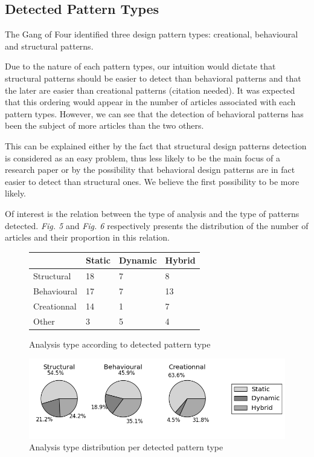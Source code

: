 \documentclass[letterpaper, 10 pt, conference]{ieeeconf}  %
\begin{document}
\subsection{Detected Pattern Types}

The Gang of Four identified three design pattern types: creational,
behavioural and structural patterns.

Due to the nature of each pattern types, our intuition would dictate that
structural patterns should be easier to detect than behavioral patterns and
that the later are easier than creational patterns (citation needed). 
It was expected that this ordering would appear in the number of articles
associated with each pattern types. 
However, we can see that the detection of behavioral patterns has been the
subject of more articles than the two others.


This can be explained either by the fact that structural design patterns
detection is considered as an easy problem, thus less likely to be the main
focus of a research paper or by the possibility that behavioral design
patterns are in fact easier to detect than structural ones.
We believe the first possibility to be more likely.

Of interest is the relation between the type of analysis and the type of
patterns detected. \textit{Fig. 5} and \textit{Fig. 6}
respectively presents the distribution of the number of articles and their
proportion in this relation. 


\begin{figure}
 \centering
 \begin{tabular}{llll}
             & Static & Dynamic & Hybrid \\
 \hline
 Structural  & 18 & 7 & 8 \\
 Behavioural & 17 & 7 & 13 \\
 Creationnal & 14 & 1 & 7 \\
 Other       & 3 & 5 & 4 \\
 \end{tabular}
 \caption{Analysis type according to detected pattern type}
\end{figure}

\begin{figure}[tb]
 \centering
 \includegraphics[scale=0.7]{analysis_v_pattern.png}
 \caption{Analysis type distribution per detected pattern type}
\end{figure}
\end{document}

